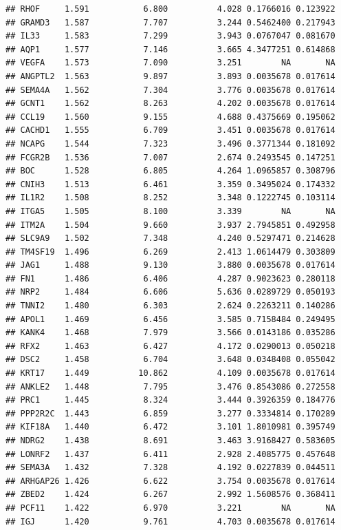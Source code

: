 \documentclass{article}\usepackage[]{graphicx}\usepackage[]{color}
\makeatletter
\newenvironment{kframe}{%
 \def\at@end@of@kframe{}%
 \ifinner\ifhmode%
  \def\at@end@of@kframe{\end{minipage}}%
  \begin{minipage}{\columnwidth}%
 \fi\fi%
 \def\FrameCommand##1{\hskip\@totalleftmargin \hskip-\fboxsep
 \colorbox{shadecolor}{##1}\hskip-\fboxsep
     \hskip-\linewidth \hskip-\@totalleftmargin \hskip\columnwidth}%
 \MakeFramed {\advance\hsize-\width
   \@totalleftmargin\z@ \linewidth\hsize
   \@setminipage}}%
 {\par\unskip\endMakeFramed%
 \at@end@of@kframe}
\newenvironment{knitrout}{}{} %
\makeatother
\begin{document}
\begin{knitrout}
\begin{kframe}
\begin{verbatim}
## RHOF     1.591           6.800          4.028 0.1766016 0.123922
## GRAMD3   1.587           7.707          3.244 0.5462400 0.217943
## IL33     1.583           7.299          3.943 0.0767047 0.081670
## AQP1     1.577           7.146          3.665 4.3477251 0.614868
## VEGFA    1.573           7.090          3.251        NA       NA
## ANGPTL2  1.563           9.897          3.893 0.0035678 0.017614
## SEMA4A   1.562           7.304          3.776 0.0035678 0.017614
## GCNT1    1.562           8.263          4.202 0.0035678 0.017614
## CCL19    1.560           9.155          4.688 0.4375669 0.195062
## CACHD1   1.555           6.709          3.451 0.0035678 0.017614
## NCAPG    1.544           7.323          3.496 0.3771344 0.181092
## FCGR2B   1.536           7.007          2.674 0.2493545 0.147251
## BOC      1.528           6.805          4.264 1.0965857 0.308796
## CNIH3    1.513           6.461          3.359 0.3495024 0.174332
## IL1R2    1.508           8.252          3.348 0.1222745 0.103114
## ITGA5    1.505           8.100          3.339        NA       NA
## ITM2A    1.504           9.660          3.937 2.7945851 0.492958
## SLC9A9   1.502           7.348          4.240 0.5297471 0.214628
## TM4SF19  1.496           6.269          2.413 1.0614479 0.303809
## JAG1     1.488           9.130          3.880 0.0035678 0.017614
## FN1      1.486           6.406          4.287 0.9023623 0.280118
## NRP2     1.484           6.606          5.636 0.0289729 0.050193
## TNNI2    1.480           6.303          2.624 0.2263211 0.140286
## APOL1    1.469           6.456          3.585 0.7158484 0.249495
## KANK4    1.468           7.979          3.566 0.0143186 0.035286
## RFX2     1.463           6.427          4.172 0.0290013 0.050218
## DSC2     1.458           6.704          3.648 0.0348408 0.055042
## KRT17    1.449          10.862          4.109 0.0035678 0.017614
## ANKLE2   1.448           7.795          3.476 0.8543086 0.272558
## PRC1     1.445           8.324          3.444 0.3926359 0.184776
## PPP2R2C  1.443           6.859          3.277 0.3334814 0.170289
## KIF18A   1.440           6.472          3.101 1.8010981 0.395749
## NDRG2    1.438           8.691          3.463 3.9168427 0.583605
## LONRF2   1.437           6.411          2.928 2.4085775 0.457648
## SEMA3A   1.432           7.328          4.192 0.0227839 0.044511
## ARHGAP26 1.426           6.622          3.754 0.0035678 0.017614
## ZBED2    1.424           6.267          2.992 1.5608576 0.368411
## PCF11    1.422           6.970          3.221        NA       NA
## IGJ      1.420           9.761          4.703 0.0035678 0.017614

\end{verbatim}
\end{kframe}
\end{knitrout}
\end{document}
